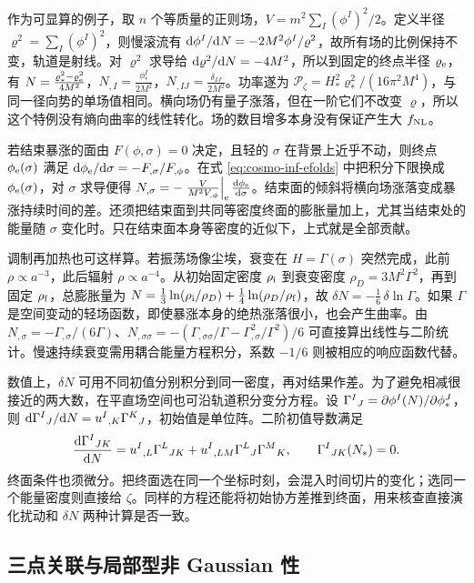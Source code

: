 作为可显算的例子，取 $n$ 个等质量的正则场，$V=m^2\sum_I(\phi^I)^2/2$。定义半径 $\varrho^2=\sum_I(\phi^I)^2$，则慢滚流有 $\dd\phi^I/\dd N=-2M^2\phi^I/\varrho^2$，故所有场的比例保持不变，轨道是射线。对 $\varrho^2$ 求导给 $\dd\varrho^2/\dd N=-4M^2$，所以到固定的终点半径 $\varrho_{\rm e}$，有 $N=\frac{\varrho_*^2-\varrho_{\rm e}^2}{4M^2}$，$N_{,I}=\frac{\phi_*^I}{2M^2}$，$N_{,IJ}=\frac{\delta_{IJ}}{2M^2}$。功率遂为 $\mathcal P_\zeta=H_*^2\varrho_*^2/(16\pi^2M^4)$，与同一径向势的单场值相同。横向场仍有量子涨落，但在一阶它们不改变 $\varrho$，所以这个特例没有熵向曲率的线性转化。场的数目增多本身没有保证产生大 $f_{\rm NL}$。

若结束暴涨的面由 $F(\phi,\sigma)=0$ 决定，且轻的 $\sigma$ 在背景上近乎不动，则终点 $\phi_{\rm e}(\sigma)$ 满足 $\dd\phi_{\rm e}/\dd\sigma=-F_{,\sigma}/F_{,\phi}$。在式 \eqref{eq:cosmo-inf-efolds} 中把积分下限换成 $\phi_{\rm e}(\sigma)$，对 $\sigma$ 求导便得 $N_{,\sigma} =-\left.\frac{V}{M^2V_{,\phi}}\right|_{\rm e} \frac{\dd\phi_{\rm e}}{\dd\sigma}$。结束面的倾斜将横向场涨落变成暴涨持续时间的差。还须把结束面到共同等密度终面的膨胀量加上，尤其当结束处的能量随 $\sigma$ 变化时。只在结束面本身等密度的近似下，上式就是全部贡献。

调制再加热也可这样算。若振荡场像尘埃，衰变在 $H=\Gamma(\sigma)$ 突然完成，此前 $\rho\propto a^{-3}$，此后辐射 $\rho\propto a^{-4}$。从初始固定密度 $\rho_{\rm i}$ 到衰变密度 $\rho_D=3M^2\Gamma^2$，再到固定 $\rho_{\rm f}$，总膨胀量为 $N=\tfrac13\ln(\rho_{\rm i}/\rho_D) +\tfrac14\ln(\rho_D/\rho_{\rm f})$，故 $\delta N=-\tfrac16\,\delta\ln\Gamma$。如果 $\Gamma$ 是空间变动的轻场函数，即使暴涨本身的绝热涨落很小，也会产生曲率。由 $N_{,\sigma}=-\Gamma_{,\sigma}/(6\Gamma)$、$N_{,\sigma\sigma}=-(\Gamma_{,\sigma\sigma}/\Gamma-\Gamma_{,\sigma}^2/\Gamma^2)/6$ 可直接算出线性与二阶统计。慢速持续衰变需用耦合能量方程积分，系数 $-1/6$ 则被相应的响应函数代替。

数值上，$\delta N$ 可用不同初值分别积分到同一密度，再对结果作差。为了避免相减很接近的两大数，在平直场空间也可沿轨道积分变分方程。设 $\Gamma^I{}_J=\partial\phi^I(N)/\partial\phi_*^J$，则 $\dd\Gamma^I{}_J/\dd N=u^I{}_{,K}\Gamma^K{}_J$，初始值是单位阵。二阶初值导数满足
\[
 \frac{\dd\Gamma^I{}_{JK}}{\dd N}
 =u^I{}_{,L}\Gamma^L{}_{JK}
  +u^I{}_{,LM}\Gamma^L{}_J\Gamma^M{}_K,\qquad
 \Gamma^I{}_{JK}(N_*)=0 .
\]
终面条件也须微分。把终面选在同一个坐标时刻，会混入时间切片的变化；选同一个能量密度则直接给 $\zeta$。同样的方程还能将初始协方差推到终面，用来核查直接演化扰动和 $\delta N$ 两种计算是否一致。

\subsection{三点关联与局部型非 Gaussian 性}\label{sec:cosmo-inf-NG}

